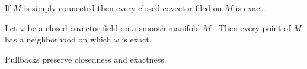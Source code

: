 \setcounter{thm}{48}

\begin{thm}
If $M$ is simply connected then every closed covector filed on $M$ is exact.
\end{thm}

\begin{cor}
Let $\omega$ be a closed covector field on a smooth manifold $M$ \wowob. Then every point of $M$ has a neighborhood on which $\omega$ is exact.
\end{cor}

\nb Pullbacks preserve closedness and exactness.
